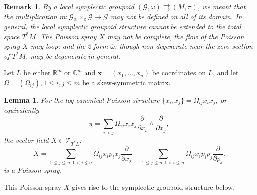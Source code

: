 \documentclass{amsart}
\newtheorem{lemma}[theorem]{Lemma}
\newtheorem{remark}[theorem]{Remark}
\newcommand{\bfx}{\mathbf{x}}
\newcommand{\cG}{\mathcal{G}}
\newcommand{\cT}{\mathcal{T}}
\newcommand{\CC}{\mathbb{C}}
\newcommand{\RR}{\mathbb{R}}
\newcommand{\rra}{\rightrightarrows}
\begin{document}
\begin{remark}
	By a local symplectic groupoid $(\cG, \omega) \rra (M, \pi)$, we meant that the multiplication $m: \cG {_\alpha \times_\beta} \cG \to \cG$ may not be defined on all of its domain. In general, the local symplectic groupoid structure cannot be extended to the total space $T^*M$. The Poisson spray $X$ may not be complete; the flow of the Poisson spray $X$ may loop; and the 2-form $\overline{\omega}$, though non-degenerate near the zero section of $T^*M$, may be degenerate in general.
\end{remark}

Let $L$ be either $\RR^m$ or $\CC^m$ and $ \bfx = (x_1, \ldots, x_n)$ be coordinates on $L$, and let $\Omega = (\Omega_{ij}), 1 \leq i,j \leq m$ be a skew-symmetric matrix.

\begin{lemma}
For the log-canonical Poisson structure $\{x_i, x_j\} = \Omega_{ij} x_i x_j$, or equivalently
$$
	\pi = \sum_{i > j} \Omega_{ij} x_ix_j\frac{\partial}{\partial x_i} \wedge \frac{\partial}{\partial x_j},
$$
the vector field $X \in \cT_{T^*L}$:
\begin{equation} \label{eq: PoisSp}
		X = \sum_{1 \leq j \leq n, 1 < i \leq n}\Omega_{ij}x_i p_i x_j\frac{\partial}{\partial x_j} - \sum_{1 \leq j \leq n, 1 < i \leq n}\Omega_{ij}x_ip_i p_j\frac{\partial}{\partial p_j}.
\end{equation}
is a Poisson spray.
\end{lemma}

This Poisson spray $X$ gives rise to the symplectic groupoid structure below.
\end{document}

